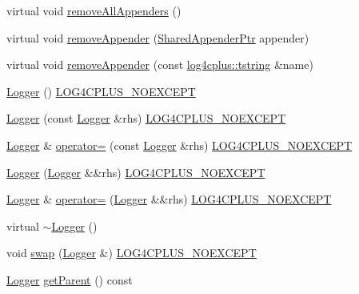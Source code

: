 \begin{DoxyCompactItemize}
\item 
virtual void \hyperlink{classlog4cplus_1_1Logger_a4cfd4f54327e9983edd0cf894599a828}{remove\-All\-Appenders} ()
\item 
virtual void \hyperlink{classlog4cplus_1_1Logger_acc841e46957dd7741c73bd53efd846d6}{remove\-Appender} (\hyperlink{namespacelog4cplus_a12d841b842c72396be9219ce67a0c215}{Shared\-Appender\-Ptr} appender)
\item 
virtual void \hyperlink{classlog4cplus_1_1Logger_a406d4a5080f9cdba0aeab40f2ec46e79}{remove\-Appender} (const \hyperlink{namespacelog4cplus_a3c9287f6ebcddc50355e29d71152117b}{log4cplus\-::tstring} \&name)
\item 
\hyperlink{classlog4cplus_1_1Logger_a73e68e1eb40a8be71eb902b09ea6358e}{Logger} () \hyperlink{config_8hxx_a77d156ef570ca81fe10eb864ea349506}{L\-O\-G4\-C\-P\-L\-U\-S\-\_\-\-N\-O\-E\-X\-C\-E\-P\-T}
\item 
\hyperlink{classlog4cplus_1_1Logger_a62f1046877e9c9e715842f314bf660e6}{Logger} (const \hyperlink{classlog4cplus_1_1Logger}{Logger} \&rhs) \hyperlink{config_8hxx_a77d156ef570ca81fe10eb864ea349506}{L\-O\-G4\-C\-P\-L\-U\-S\-\_\-\-N\-O\-E\-X\-C\-E\-P\-T}
\item 
\hyperlink{classlog4cplus_1_1Logger}{Logger} \& \hyperlink{classlog4cplus_1_1Logger_a39fffa95cef803f7e68b94f07912a20e}{operator=} (const \hyperlink{classlog4cplus_1_1Logger}{Logger} \&rhs) \hyperlink{config_8hxx_a77d156ef570ca81fe10eb864ea349506}{L\-O\-G4\-C\-P\-L\-U\-S\-\_\-\-N\-O\-E\-X\-C\-E\-P\-T}
\item 
\hyperlink{classlog4cplus_1_1Logger_a7cc60b56c63b19ecb520b55ad3b1f494}{Logger} (\hyperlink{classlog4cplus_1_1Logger}{Logger} \&\&rhs) \hyperlink{config_8hxx_a77d156ef570ca81fe10eb864ea349506}{L\-O\-G4\-C\-P\-L\-U\-S\-\_\-\-N\-O\-E\-X\-C\-E\-P\-T}
\item 
\hyperlink{classlog4cplus_1_1Logger}{Logger} \& \hyperlink{classlog4cplus_1_1Logger_aedcaf2af7a50f5b5366723d457ec41e0}{operator=} (\hyperlink{classlog4cplus_1_1Logger}{Logger} \&\&rhs) \hyperlink{config_8hxx_a77d156ef570ca81fe10eb864ea349506}{L\-O\-G4\-C\-P\-L\-U\-S\-\_\-\-N\-O\-E\-X\-C\-E\-P\-T}
\item 
virtual \hyperlink{classlog4cplus_1_1Logger_a33402906aaa6a2b5528691d0cfdfb60a}{$\sim$\-Logger} ()
\item 
void \hyperlink{classlog4cplus_1_1Logger_a3073471f478c67e4ebed1c00c8eaa3d4}{swap} (\hyperlink{classlog4cplus_1_1Logger}{Logger} \&) \hyperlink{config_8hxx_a77d156ef570ca81fe10eb864ea349506}{L\-O\-G4\-C\-P\-L\-U\-S\-\_\-\-N\-O\-E\-X\-C\-E\-P\-T}
\item 
\hyperlink{classlog4cplus_1_1Logger}{Logger} \hyperlink{classlog4cplus_1_1Logger_af776e451c17c7f89fa211741b3b0870a}{get\-Parent} () const 
\end{DoxyCompactItemize}
